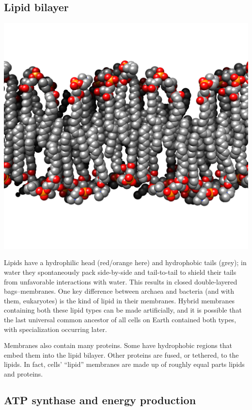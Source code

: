 \documentclass[]{tufte-book}
\begin{document}
\subsection{Lipid bilayer}\label{Lipid_bilayer}

\includegraphics{img/schematics/2_1_1}

Lipids have a hydrophilic head (red/orange here) and hydrophobic tails
(grey); in water they spontaneously pack side-by-side and tail-to-tail
to shield their tails from unfavorable interactions with water. This
results in closed double-layered bags--membranes. One key difference
between archaea and bacteria (and with them, eukaryotes) is the kind of
lipid in their membranes. Hybrid membranes containing both these lipid
types can be made artificially, and it is possible that the last
universal common ancestor of all cells on Earth contained both types,
with specialization occurring later.

Membranes also contain many proteins. Some have hydrophobic regions that
embed them into the lipid bilayer. Other proteins are fused, or
tethered, to the lipids. In fact, cells' ``lipid'' membranes are made up
of roughly equal parts lipids and proteins.

\subsection{ATP synthase and energy
production}\label{ATP_synthase_and_energy_production}
\end{document}
